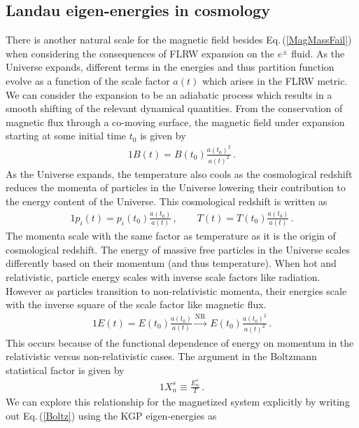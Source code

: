 \documentclass[universe,article,submit,moreauthors,pdftex,a4paper]{Definitions/mdpi}
\newcommand{\req}[1]{Eq.\,(\ref{#1})}
\begin{document}
\subsection{Landau eigen-energies in cosmology}\label{sec:Landau}
\noindent There is another natural scale for the magnetic field besides \req{MagMassFail} when considering the consequences of FLRW expansion on the $e^{\pm}$ fluid. As the Universe expands, different terms in the energies and thus partition function evolve as a function of the scale factor $a(t)$ which arises in the FLRW metric. We can consider the expansion to be an adiabatic process which results in a smooth shifting of the relevant dynamical quantities. From the conservation of magnetic flux through a co-moving surface, the magnetic field under expansion starting at some initial time $t_{0}$ is given by
\begin{alignat}{1}
 \label{BScale} B(t) = B(t_{0})\frac{a(t_{0})^{2}}{a(t)^{2}}\,.
\end{alignat}
As the Universe expands, the temperature also cools as the cosmological redshift reduces the momenta of particles in the Universe lowering their contribution to the energy content of the Universe. This cosmological redshift is written as
\begin{alignat}{1}
 \label{Redshift} p_{i}(t) = p_{i}(t_{0})\frac{a(t_{0})}{a(t)}\,,\qquad T(t) = T(t_{0})\frac{a(t_{0})}{a(t)}\,.
\end{alignat}
The momenta scale with the same factor as temperature as it is the origin of cosmological redshift. The energy of massive free particles in the Universe scales differently based on their momentum (and thus temperature). When hot and relativistic, particle energy scales with inverse scale factors like radiation. However as particles transition to non-relativistic momenta, their energies scale with the inverse square of the scale factor like magnetic flux.
\begin{alignat}{1}
 \label{EScale} E(t) = E(t_{0})\frac{a(t_{0})}{a(t)}\xrightarrow{\mathrm{NR}}\ E(t_{0})\frac{a(t_{0})^{2}}{a(t)^{2}}\,.
\end{alignat}
This occurs because of the functional dependence of energy on momentum in the relativistic versus non-relativistic cases. The argument in the Boltzmann statistical factor is given by
\begin{alignat}{1}
 \label{Boltz} X_{n}^{s}\equiv\frac{E_{n}^{s}}{T}\,.
\end{alignat}
We can explore this relationship for the magnetized system explicitly by writing out \req{Boltz} using the KGP eigen-energies as
\end{document}
